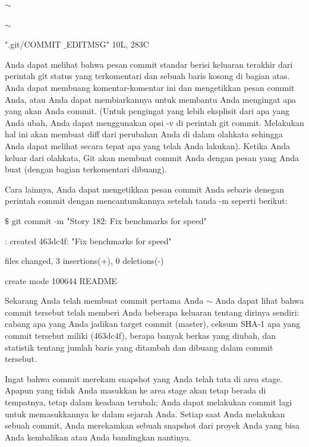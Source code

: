 \noindent 
 $  \sim  $ \par
\noindent 
 $  \sim  $ \par
\noindent 
".git/COMMIT $  \_  $EDITMSG" 10L, 283C \par
\vspace{12pt}
\vspace{12pt}
\noindent 
Anda dapat melihat bahwa pesan commit standar berisi keluaran terakhir dari perintah git status yang terkomentari dan sebuah baris kosong di bagian atas. Anda dapat membuang komentar-komentar ini dan mengetikkan pesan commit Anda, atau Anda dapat membiarkannya untuk membantu Anda mengingat apa yang akan Anda commit. (Untuk pengingat yang lebih eksplisit dari apa yang Anda ubah, Anda dapat menggunakan opsi -v di perintah git commit. Melakukan hal ini akan membuat diff dari perubahan Anda di dalam olahkata sehingga Anda dapat melihat secara tepat apa yang telah Anda lakukan). Ketika Anda keluar dari olahkata, Git akan membuat commit Anda dengan pesan yang Anda buat (dengan bagian terkomentari dibuang). \par
\noindent 
Cara lainnya, Anda dapat mengetikkan pesan commit Anda sebaris denegan perintah commit dengan mencantumkannya setelah tanda -m seperti berikut: \par
\vspace{12pt}
\vspace{12pt}
\noindent 
 $  \$  $ git commit -m "Story 182: Fix benchmarks for speed" \par
\noindent 
[master]: created 463dc4f: "Fix benchmarks for speed" \par
{} files changed, 3 insertions(+), 0 deletions(-) \par
\noindent 
 create mode 100644 README \par
\vspace{12pt}
\vspace{12pt}
\noindent 
Sekarang Anda telah membuat commit pertama Anda $  \sim  $ Anda dapat lihat bahwa commit tersebut telah memberi Anda beberapa keluaran tentang dirinya sendiri: cabang apa yang Anda jadikan target commit (master), ceksum SHA-1 apa yang commit tersebut miliki (463dc4f), berapa banyak berkas yang diubah, dan statistik tentang jumlah baris yang ditambah dan dibuang dalam commit tersebut. \par
\noindent 
Ingat bahwa commit merekam snapshot yang Anda telah tata di area stage. Apapun yang tidak Anda masukkan ke area stage akan tetap berada di tempatnya, tetap dalam keadaan terubah; Anda dapat melakukan commit lagi untuk memasukkannya ke dalam sejarah Anda. Setiap saat Anda melakukan sebuah commit, Anda merekamkan sebuah snapshot dari proyek Anda yang bisa Anda kembalikan atau Anda bandingkan nantinya. \par
